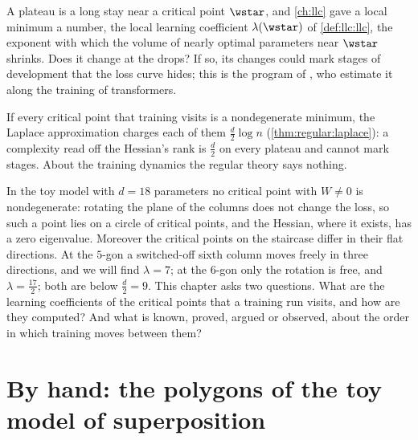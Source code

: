 \begin{refsection}
A plateau is a long stay near a critical point $\wstar$, and \cref{ch:llc} gave a local minimum a number, the local learning coefficient $\lambda(\wstar)$ of \cref{def:llc:llc}, the exponent with which the volume of nearly optimal parameters near $\wstar$ shrinks. Does it change at the drops? If so, its changes could mark stages of development that the loss curve hides; this is the program of \textcite{HooglandEtAl2025}, who estimate it along the training of transformers.

\begin{regularanswer}
If every critical point that training visits is a nondegenerate minimum, the Laplace approximation charges each of them $\frac d2\log n$ (\cref{thm:regular:laplace}): a complexity read off the Hessian's rank is $\frac d2$ on every plateau and cannot mark stages. About the training dynamics the regular theory says nothing.
\end{regularanswer}

In the toy model with $d=18$ parameters no critical point with $W\ne0$ is nondegenerate: rotating the plane of the columns does not change the loss, so such a point lies on a circle of critical points, and the Hessian, where it exists, has a zero eigenvalue. Moreover the critical points on the staircase differ in their flat directions. At the $5$-gon a switched-off sixth column moves freely in three directions, and we will find $\lambda=7$; at the $6$-gon only the rotation is free, and $\lambda=\frac{17}2$; both are below $\frac d2=9$. This chapter asks two questions. What are the learning coefficients of the critical points that a training run visits, and how are they computed? And what is known, proved, argued or observed, about the order in which training moves between them?

\section{By hand: the polygons of the toy model of superposition}\label{sec:stages:byhand}


\end{refsection}
